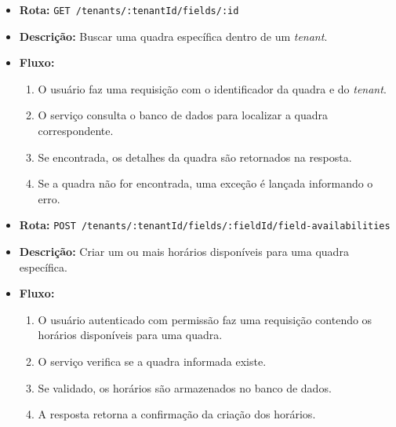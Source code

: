 \begin{itemize}
    \item \textbf{Rota:} \texttt{GET /tenants/:tenantId/fields/:id}
    \item \textbf{Descrição:} Buscar uma quadra específica dentro de um \textit{tenant}.
    \item \textbf{Fluxo:}
    \begin{enumerate}
        \item O usuário faz uma requisição com o identificador da quadra e do \textit{tenant}.
        \item O serviço consulta o banco de dados para localizar a quadra correspondente.
        \item Se encontrada, os detalhes da quadra são retornados na resposta.
        \item Se a quadra não for encontrada, uma exceção é lançada informando o erro.
    \end{enumerate}
\end{itemize}

\begin{itemize}
    \item \textbf{Rota:} \texttt{POST /tenants/:tenantId/fields/:fieldId/field-availabilities}
    \item \textbf{Descrição:} Criar um ou mais horários disponíveis para uma quadra específica.
    \item \textbf{Fluxo:}
    \begin{enumerate}
        \item O usuário autenticado com permissão faz uma requisição contendo os horários disponíveis para uma quadra.
        \item O serviço verifica se a quadra informada existe.
        \item Se validado, os horários são armazenados no banco de dados.
        \item A resposta retorna a confirmação da criação dos horários.
    \end{enumerate}
\end{itemize}

